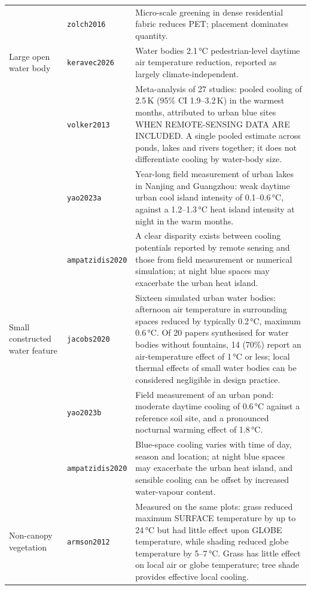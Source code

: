 \begin{longtable}{@{}>{\raggedright\arraybackslash}p{30mm} l
                    >{\raggedright\arraybackslash}p{72mm}@{}}
 & \texttt{zolch2016} &
Micro-scale greening in dense residential fabric reduces PET; placement dominates quantity. \\
\addlinespace
Large open water body & \texttt{keravec2026} &
Water bodies 2.1\,\si{\degreeCelsius} pedestrian-level daytime air temperature reduction, reported as largely climate-independent. \\
 & \texttt{volker2013} &
Meta-analysis of 27 studies: pooled cooling of 2.5\,\si{\kelvin} (95\% CI 1.9--3.2\,\si{\kelvin}) in the warmest months, attributed to urban blue sites WHEN REMOTE-SENSING DATA ARE INCLUDED. A single pooled estimate across ponds, lakes and rivers together; it does not differentiate cooling by water-body size. \\
 & \texttt{yao2023a} &
Year-long field measurement of urban lakes in Nanjing and Guangzhou: weak daytime urban cool island intensity of 0.1--0.6\,\si{\degreeCelsius}, against a 1.2--1.3\,\si{\degreeCelsius} heat island intensity at night in the warm months. \\
 & \texttt{ampatzidis2020} &
A clear disparity exists between cooling potentials reported by remote sensing and those from field measurement or numerical simulation; at night blue spaces may exacerbate the urban heat island. \\
\addlinespace
Small constructed water feature & \texttt{jacobs2020} &
Sixteen simulated urban water bodies: afternoon air temperature in surrounding spaces reduced by typically 0.2\,\si{\degreeCelsius}, maximum 0.6\,\si{\degreeCelsius}. Of 20 papers synthesised for water bodies without fountains, 14 (70\%) report an air-temperature effect of 1\,\si{\degreeCelsius} or less; local thermal effects of small water bodies can be considered negligible in design practice. \\
 & \texttt{yao2023b} &
Field measurement of an urban pond: moderate daytime cooling of 0.6\,\si{\degreeCelsius} against a reference soil site, and a pronounced nocturnal warming effect of 1.8\,\si{\degreeCelsius}. \\
 & \texttt{ampatzidis2020} &
Blue-space cooling varies with time of day, season and location; at night blue spaces may exacerbate the urban heat island, and sensible cooling can be offset by increased water-vapour content. \\
\addlinespace
Non-canopy vegetation & \texttt{armson2012} &
Measured on the same plots: grass reduced maximum SURFACE temperature by up to 24\,\si{\degreeCelsius} but had little effect upon GLOBE temperature, while shading reduced globe temperature by 5--7\,\si{\degreeCelsius}. Grass has little effect on local air or globe temperature; tree shade provides effective local cooling. \\

\end{longtable}
